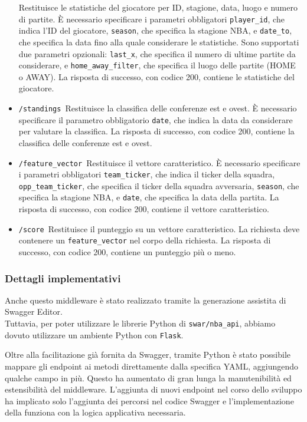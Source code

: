 \begin{itemize}
    Restituisce le statistiche del giocatore per ID, stagione, data, luogo e numero di partite. È necessario specificare i parametri obbligatori \texttt{player\_id}, che indica l'ID del giocatore, \texttt{season}, che specifica la stagione NBA, e \texttt{date\_to}, che specifica la data fino alla quale considerare le statistiche. Sono supportati due parametri opzionali: \texttt{last\_x}, che specifica il numero di ultime partite da considerare, e \texttt{home\_away\_filter}, che specifica il luogo delle partite (HOME o AWAY). La risposta di successo, con codice 200, contiene le statistiche del giocatore.
    \item \texttt{/standings}\
    Restituisce la classifica delle conferenze est e ovest. È necessario specificare il parametro obbligatorio \texttt{date}, che indica la data da considerare per valutare la classifica. La risposta di successo, con codice 200, contiene la classifica delle conferenze est e ovest.
    \item \texttt{/feature\_vector}\
    Restituisce il vettore caratteristico. È necessario specificare i parametri obbligatori \texttt{team\_ticker}, che indica il ticker della squadra, \texttt{opp\_team\_ticker}, che specifica il ticker della squadra avversaria, \texttt{season}, che specifica la stagione NBA, e \texttt{date}, che specifica la data della partita. La risposta di successo, con codice 200, contiene il vettore caratteristico.
    \item \texttt{/score}\
    Restituisce il punteggio su un vettore caratteristico. La richiesta deve contenere un \texttt{feature\_vector} nel corpo della richiesta. La risposta di successo, con codice 200, contiene un punteggio più o meno.
\end{itemize}


\subsubsection{Dettagli implementativi}
Anche questo middleware è stato realizzato tramite la generazione assistita di Swagger Editor.\\
Tuttavia, per poter utilizzare le librerie Python di \texttt{swar/nba\_api}, abbiamo dovuto utilizzare un ambiente Python con \texttt{Flask}. 

Oltre alla facilitazione già fornita da Swagger, tramite Python è stato possibile mappare gli endpoint ai metodi direttamente dalla specifica YAML, aggiungendo qualche campo in più. Questo ha aumentato di gran lunga la manutenibilità ed estensibilità del middleware. L'aggiunta di nuovi endpoint nel corso dello sviluppo ha implicato solo l'aggiunta dei percorsi nel codice Swagger e l'implementazione della funziona con la logica applicativa necessaria.


